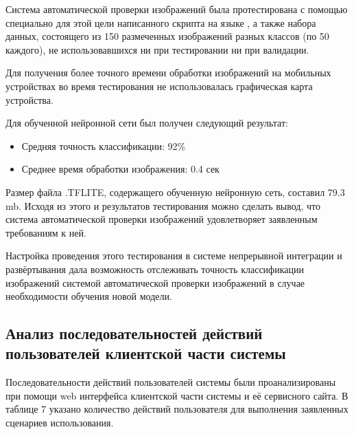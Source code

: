 \tab
Система автоматической проверки изображений была протестирована с помощью специально для этой цели написанного скрипта на языке , а также набора данных, состоящего из 150 размеченных изображений разных классов (по 50 каждого), не использовавшихся ни при тестировании ни при валидации.

\tab
Для получения более точного времени обработки изображений на мобильных устройствах во время тестирования не использовалась графическая карта устройства.

\tab
Для обученной нейронной сети был получен следующий результат:
\begin{itemize}
	\item Средняя точность классификации: 92\%
	\item Среднее время обработки изображения: 0.4 сек
\end{itemize}

\tab
Размер файла .TFLITE, содержащего обученную нейронную сеть, составил 79.3 mb.
Исходя из этого и результатов тестирования можно сделать вывод, что система автоматической проверки изображений удовлетворяет заявленным требованиям к ней.

\tab
Настройка проведения этого тестирования в системе непрерывной интеграции и развёртывания дала возможность отслеживать точность классификации изображений системой автоматической проверки изображений в случае необходимости обучения новой модели.

\subsection{Анализ последовательностей действий пользователей клиентской части системы}

\tab
Последовательности действий пользователей системы были проанализированы при помощи web интерфейса клиентской части системы и её сервисного сайта.
В таблице 7 указано количество действий пользователя для выполнения заявленных сценариев использования.
\tableseven

